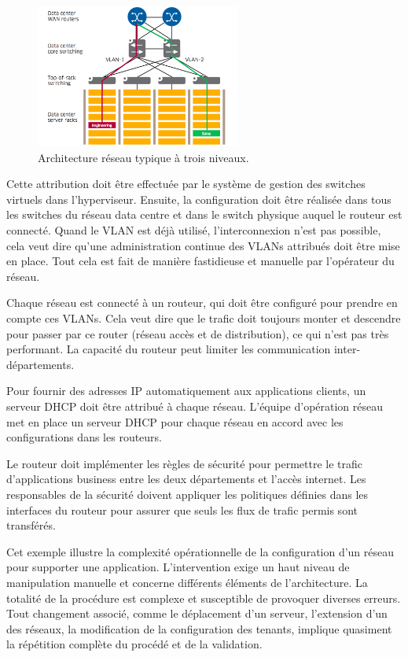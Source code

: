 \begin{figure}[h]
\begin{center}
\includegraphics[width=0.6\textwidth]{images/AspecMultiTenant} 
\caption{Architecture réseau typique à trois niveaux. \cite{leveragingSDNCloudNetworkServiceExample}} \label{AspecMultiTenant}
\end{center}
\end{figure} 

Cette attribution doit être effectuée par le système de gestion des switches virtuels dans l'hyperviseur. Ensuite, la configuration doit être réalisée dans tous les switches du réseau data centre et dans le switch physique auquel le routeur est connecté. Quand le VLAN est déjà utilisé, l'interconnexion n'est pas possible, cela veut dire qu'une administration continue des VLANs attribués doit être mise en place. Tout cela est fait de manière fastidieuse et manuelle par l'opérateur du réseau.

Chaque réseau est connecté à un routeur, qui doit être configuré pour prendre en compte ces VLANs. Cela veut dire que le trafic doit toujours monter et descendre pour passer par ce router (réseau accès et de distribution), ce qui n'est pas très performant. La capacité du routeur peut limiter les communication inter-départements. 

Pour fournir des adresses IP automatiquement aux applications clients, un serveur DHCP doit être attribué à chaque réseau. L'équipe d'opération réseau met en place un serveur DHCP pour chaque réseau en accord avec les configurations dans les routeurs.

Le routeur doit implémenter les règles de sécurité pour permettre le trafic d'applications business entre les deux départements et l'accès internet. Les responsables de la sécurité doivent appliquer les politiques définies dans les interfaces du routeur pour assurer que seuls les flux de trafic permis sont transférés.

Cet exemple illustre la complexité opérationnelle de la configuration d'un réseau pour supporter une application. L'intervention exige un haut niveau de manipulation manuelle et concerne différents éléments de l'architecture. La totalité de la procédure est complexe et susceptible de provoquer diverses erreurs. Tout changement associé, comme le déplacement d'un serveur, l'extension d'un des réseaux, la modification de la configuration des tenants, implique quasiment la répétition complète du procédé et de la validation.

